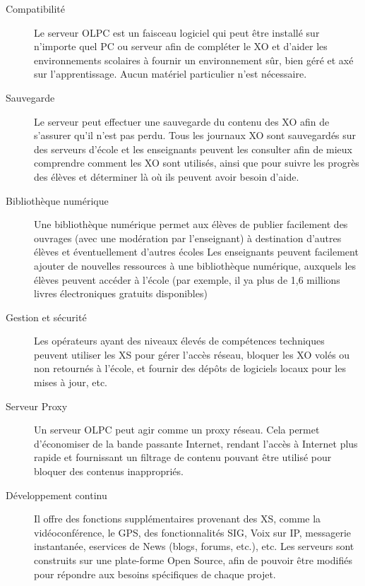 \documentclass[12pt]{article}
\begin{document}
\begin{description}
\item[Compatibilité] Le serveur OLPC est un faisceau logiciel qui peut être
                   installé sur n'importe quel PC ou serveur afin de
                   compléter le XO et d'aider les environnements scolaires
                   à fournir un environnement sûr, bien géré et axé sur
                   l'apprentissage. Aucun matériel particulier n'est
                   nécessaire.
\item[Sauvegarde] Le serveur peut effectuer une sauvegarde du contenu des XO
                afin de s'assurer qu'il n'est pas perdu. Tous les journaux
                XO sont sauvegardés sur des serveurs d'école et les
                enseignants peuvent les consulter afin de mieux comprendre
                comment les XO sont utilisés, ainsi que pour suivre les
                progrès des élèves et déterminer là où ils peuvent avoir
                besoin d'aide.
\item[Bibliothèque numérique] Une bibliothèque numérique permet aux élèves de
     publier facilement des ouvrages (avec une modération par l'enseignant)
     à destination d'autres élèves et éventuellement d'autres écoles Les
     enseignants peuvent facilement ajouter de nouvelles ressources à une
     bibliothèque numérique, auxquels les élèves peuvent accéder à l'école
     (par exemple, il ya plus de 1,6 millions livres électroniques gratuits
     disponibles)
\item[Gestion et sécurité] Les opérateurs ayant des niveaux élevés de
     compétences techniques peuvent utiliser les XS pour gérer l'accès
     réseau, bloquer les XO volés ou non retournés à l'école, et fournir
     des dépôts de logiciels locaux pour les mises à jour, etc.
\item[Serveur Proxy] Un serveur OLPC peut agir comme un proxy réseau. Cela
                   permet d'économiser de la bande passante Internet,
                   rendant l'accès à Internet plus rapide et fournissant un
                   filtrage de contenu pouvant être utilisé pour bloquer
                   des contenus inappropriés.
\item[Développement continu] Il offre des fonctions supplémentaires provenant
     des XS, comme la vidéoconférence, le GPS, des fonctionnalités SIG,
     Voix sur IP, messagerie instantanée, eservices de News (blogs, forums,
     etc.), etc. Les serveurs sont construits sur une plate-forme Open
     Source, afin de pouvoir être modifiés pour répondre aux besoins
     spécifiques de chaque projet.
\end{description}
\end{document}
